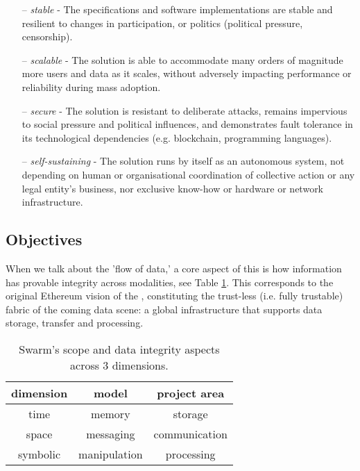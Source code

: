 \begin{itemize}[noitemsep]
\item[--] \emph{stable} - The specifications and software implementations are stable and resilient to changes in participation, or politics (political pressure, censorship).
\item[--] \emph{scalable} - The solution is able to accommodate many orders of magnitude more users and data as it scales, without adversely impacting performance or reliability during mass adoption.  
\item[--] \emph{secure} - The solution is resistant to deliberate attacks, remains impervious to social pressure and political influences, and demonstrates fault tolerance in its technological dependencies (e.g. blockchain, programming languages). 
\item[--] \emph{self-sustaining} - The solution runs by itself as an autonomous system, not depending on human or organisational coordination of collective action or any legal entity's business, nor exclusive know-how or hardware or network infrastructure. 
\end{itemize}




\subsection{Objectives \statusyellow}\label{sec:objectives}


When we talk about the 'flow of data,' a core aspect of this is how information has provable integrity across modalities, see Table \ref{tab:scope}. This corresponds to the original Ethereum vision of the ,  constituting the trust-less (i.e. fully trustable) fabric of the coming data scene: a global infrastructure that supports data storage, transfer and processing.

\begin{table}[!htb]
\centering
\begin{tabular}{c|c|c}
dimension & model & project area\\\hline
%
time & memory & storage \\
space & messaging & communication \\
symbolic & manipulation & processing \\
\end{tabular}
\caption{Swarm's scope and data integrity aspects across 3 dimensions.}
\label{tab:scope}
\end{table}

